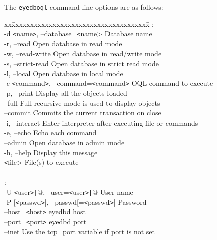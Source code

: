 The \texttt{eyedboql} command line options are as follows:
\begin{tabbing}
xx\=xxxxxxxxxxxxxxxxxxxxxxxxxxxxxxxxxxxxx\=\kill
{}:\\
\>  -d \texttt{<}name\texttt{>}, --database=\texttt{<}name>    \>  Database name\\
\>  -r, --read                     \>   Open database in read mode\\
\>  -w, --read-write               \>   Open database in read/write mode\\
\>  -s, --strict-read               \>  Open database in strict read mode\\
\>  -l, --local                \>       Open database in local mode\\
\>  -c \texttt{<}command\texttt{>}, --command=\texttt{<}command\texttt{>}\> OQL command to execute\\
\>  -p, --print                      \> Display all the objects loaded\\
\>  --full                          \>  Full recursive mode is used to display objects\\
\>  --commit                        \>  Commits the current transaction on close\\
\>  -i, --interact                  \>  Enter interpreter after executing file or commands\\
\>  -e, --echo                      \>  Echo each command\\
\>  --admin                         \>  Open database in admin mode\\
\>  -h, --help                      \>  Display this message\\
\>  {\texttt{<}file>}                        \>  File(s) to execute\\
\> \\
:\\
\>  -U \texttt{<}user\texttt{>}\texttt{|}@, --user=\texttt{<}user\texttt{>}\texttt{|}@    \>    User name\\
\>  -P [\texttt{<}passwd\texttt{>}], --passwd[=\texttt{<}passwd\texttt{>}]\>  Password\\
\>  --host=\texttt{<}host\texttt{>}                \>       eyedbd host\\
\>  --port=\texttt{<}port\texttt{>}              \>         eyedbd port\\
\>  --inet                       \>       Use the tcp\_port variable if port is not set\\

\end{tabbing}
